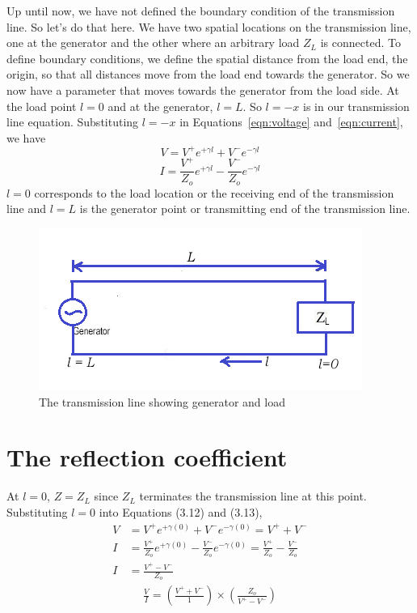 Up until now, we have not defined the boundary condition of the transmission line. So let's do that here. We have two spatial locations on the transmission line, one at the generator and the other where an arbitrary load $Z_L$ is connected. To define boundary conditions, we define the spatial distance from the load end, the origin, so that all distances move from the load end towards the generator. So we now have a parameter that moves towards the generator from the load side. At the load point $l = 0$ and at the generator, $l = L$. So $l = -x$ is in our transmission line equation. Substituting $l = -x$ in Equations~\ref{eqn:voltage} and~\ref{eqn:current}, we have
\begin{equation}
V = V^+e^{+\gamma l}+V^-e^{-\gamma l}
\label{eqn:voltagefromload}
\end{equation}
\begin{equation}
I = \frac{V^+}{Z_o}e^{+\gamma l}-\frac{V^-}{Z_o}e^{-\gamma l}
\label{eqn:currentfromload}
\end{equation}
$l = 0$ corresponds to the load location or the receiving end of the transmission line and $l = L$ is the generator point or transmitting end of the transmission line.
\begin{figure}[h]
\centering
\includegraphics[scale=0.8]{./graphics/tlcircuit}
\caption{The transmission line showing generator and load}
\end{figure}

\section{The reflection coefficient}
At $l = 0$, $Z = Z_L$ since $Z_L$ terminates the transmission line at this point. Substituting $l = 0$ into Equations (3.12) and (3.13),
\begin{align*}
V &= V^+e^{+\gamma (0)}+V^-e^{-\gamma (0)} = V^+ + V^-\\
I &= \frac{V^+}{Z_o}e^{+\gamma (0)}-\frac{V^-}{Z_o}e^{-\gamma (0)} = \frac{V^+}{Z_o} - \frac{V^-}{Z_o} \\
I &= \frac{V^+ - V^-}{Z_o}
\end{align*}
\begin{align*}
\frac{V}{I} = \left( \frac{V^+ + V^-}{1}\right)  \times \left( \frac{Z_o}{V^+ - V^-}\right) 
\end{align*}

